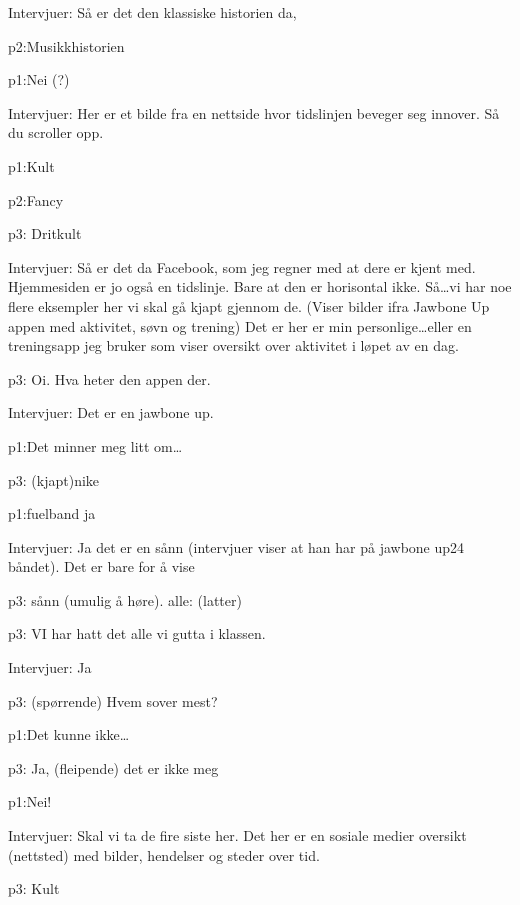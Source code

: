 \documentclass[11pt,UKenglish, a4paper]{article}
\begin{document}
\textcolor{myBlue} {Intervjuer:} Så er det den klassiske historien da, 

\textcolor{myYellow} {p2:}Musikkhistorien

\textcolor{myGreen} {p1:}Nei (?)

\textcolor{myBlue} {Intervjuer:} Her er et bilde fra en nettside hvor tidslinjen beveger seg innover. Så du scroller opp.

\textcolor{myGreen} {p1:}Kult

\textcolor{myYellow} {p2:}Fancy

\textcolor{myR} {p3:} Dritkult

\textcolor{myBlue} {Intervjuer:} Så er det da Facebook, som jeg regner med at dere er kjent med. Hjemmesiden er jo også en tidslinje. Bare at den er 
horisontal ikke. Så\dots vi har noe flere eksempler her vi skal gå kjapt gjennom de. (Viser bilder ifra Jawbone Up appen med aktivitet, søvn og 
trening) Det er her er min personlige\dots eller en treningsapp jeg bruker som viser oversikt over aktivitet i løpet av en dag. 


\textcolor{myR} {p3:} Oi. Hva heter den appen der.


\textcolor{myBlue} {Intervjuer:} Det er en jawbone up.

\textcolor{myGreen} {p1:}Det minner meg litt om\dots

\textcolor{myR} {p3:} (kjapt)nike

\textcolor{myGreen} {p1:}fuelband ja


\textcolor{myBlue} {Intervjuer:} Ja det er en sånn (intervjuer viser at han har på jawbone up24 båndet). Det er bare for å vise

\textcolor{myR} {p3:} sånn (\textcolor{myR}{umulig å høre}). 
alle: (latter)

\textcolor{myR} {p3:} VI har hatt det alle vi gutta i klassen.

\textcolor{myBlue} {Intervjuer:} Ja

\textcolor{myR} {p3:} (spørrende) Hvem sover mest?

\textcolor{myGreen} {p1:}Det kunne ikke\dots

\textcolor{myR} {p3:} Ja, (fleipende) det er ikke meg

\textcolor{myGreen} {p1:}Nei!

\textcolor{myBlue} {Intervjuer:} Skal vi ta de fire siste her. Det her er en sosiale medier oversikt (nettsted) med bilder, hendelser og steder over tid.

\textcolor{myR} {p3:} Kult
\end{document}
